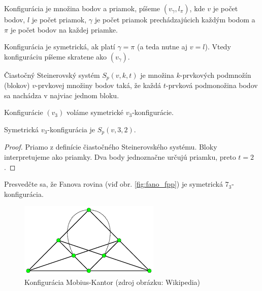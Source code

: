 \begin{definition}
	Konfigurácia je množina bodov a priamok, píšeme $(v_\gamma, l_\pi)$, kde $v$ je počet bodov, $l$ je počet priamok, $\gamma$ je počet priamok prechádzajúcich každým bodom a $\pi$ je počet bodov na každej priamke.
\end{definition}

\begin{definition}
	Konfigurácia je symetrická, ak platí $\gamma = \pi$ (a teda nutne aj $v = l$). Vtedy konfiguráciu píšeme skratene ako $(v_\gamma)$.
\end{definition}

\begin{definition}
	Čiastočný Steinerovský systém $S_p(v, k, t)$ je množina $k$-prvkových podmnožín (blokov) $v$-prvkovej množiny bodov taká, že každá $t$-prvková podmonožina bodov sa nachádza v najviac jednom bloku.
\end{definition}

Konfigurácie $(v_3)$ voláme symetrické $v_3$-konfigurácie.

\begin{lemma}
	Symetrická $v_3$-konfigurácia je $S_p(v, 3, 2)$.
\end{lemma}

\begin{proof}
	Priamo z definície čiastočného Steinerovského systému. Bloky interpretujeme ako priamky. Dva body jednoznačne určujú priamku, preto $t = 2$.
\end{proof}

\begin{exercise}
	\label{ex:fano73}
	Presvedčte sa, že Fanova rovina (viď obr. \ref{fig:fano_fpp}) je symetrická $7_3$-konfigurácia.
\end{exercise}

\begin{figure}
	\centering
	\includegraphics[width=0.6\textwidth]{mobius_kantor_configuration}
	\caption{Konfigurácia Mobius-Kantor (zdroj obrázku: Wikipedia)}
	\label{img:mobiuskantorconfiguration}
\end{figure}

